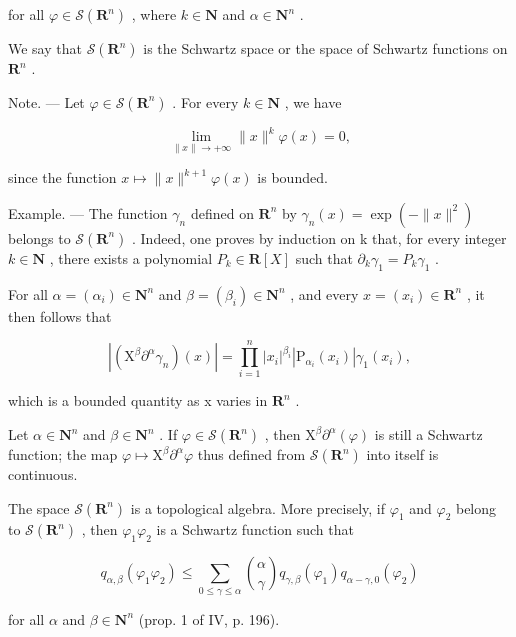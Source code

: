 for all \(\varphi\in\mathcal{S}(\mathbf{R}^{n})\) , where \(k\in\mathbf{N}\) and \(\alpha\in\mathbf{N}^{n}\) .

We say that \(\mathcal{S}(\mathbf{R}^{n})\) is the Schwartz space or the space of Schwartz functions on \(\mathbf{R}^{n}\) .

Note. --- Let \(\varphi\in\mathcal{S}(\mathbf{R}^{n})\) . For every \(k\in\mathbf{N}\) , we have

\[
\lim _ {\| x \| \to + \infty} \| x \| ^ {k} \varphi (x) = 0,
\]

since the function \(x \mapsto \|x\|^{k+1} \varphi(x)\) is bounded.

Example. --- The function \(\gamma_{n}\) defined on \(\mathbf{R}^{n}\) by \(\gamma_{n}(x)=\exp(-\|x\|^{2})\) belongs to \(\mathcal{S}(\mathbf{R}^{n})\) . Indeed, one proves by induction on k that, for every integer \(k\in \mathbf{N}\) , there exists a polynomial \(P_{k}\in\mathbf{R}[X]\) such that \(\partial_{k}\gamma_{1}=P_{k}\gamma_{1}\) .

For all \(\alpha = (\alpha_{i})\in \mathbf{N}^{n}\) and \(\beta = (\beta_{i})\in \mathbf{N}^{n}\) , and every \(x = (x_{i})\in \mathbf{R}^{n}\) , it then follows that

\[
| (\mathrm{X} ^ {\beta} \partial^ {\alpha} \gamma_ {n}) (x) | = \prod_ {i = 1} ^ {n} | x _ {i} | ^ {\beta_ {i}} | \mathrm{P} _ {\alpha_ {i}} (x _ {i}) | \gamma_ {1} (x _ {i}),
\]

which is a bounded quantity as x varies in \(\mathbf{R}^{n}\) .

Let \(\alpha \in \mathbf{N}^n\) and \(\beta \in \mathbf{N}^n\) . If \(\varphi \in \mathcal{S}(\mathbf{R}^n)\) , then \(\mathrm{X}^{\beta}\partial^{\alpha}(\varphi)\) is still a Schwartz function; the map \(\varphi \mapsto \mathrm{X}^{\beta}\partial^{\alpha}\varphi\) thus defined from \(\mathcal{S}(\mathbf{R}^n)\) into itself is continuous.

The space \(\mathcal{S}(\mathbf{R}^{n})\) is a topological algebra. More precisely, if \(\varphi_{1}\) and \(\varphi_{2}\) belong to \(\mathcal{S}(\mathbf{R}^{n})\) , then \(\varphi_{1}\varphi_{2}\) is a Schwartz function such that

\[
q _ {\alpha , \beta} (\varphi_ {1} \varphi_ {2}) \leqslant \sum_ {0 \leqslant \gamma \leqslant \alpha} \binom{\alpha}{\gamma} q _ {\gamma , \beta} (\varphi_ {1}) q _ {\alpha - \gamma , 0} (\varphi_ {2})\tag{2}
\]

for all \(\alpha\) and \(\beta \in \mathbf{N}^n\) (prop. 1 of IV, p. 196).

